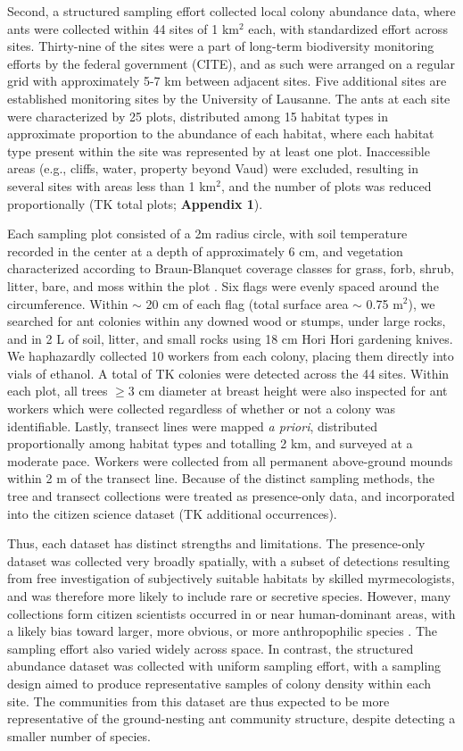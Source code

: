 \documentclass[preprint,review,times,12pt]{elsarticle}
\begin{document}
Second, a structured sampling effort collected local colony abundance data, where ants were collected within 44 sites of 1 km$^2$ each, with standardized effort across sites. Thirty-nine of the sites were a part of long-term biodiversity monitoring efforts by the federal government (CITE), and as such were arranged on a regular grid with approximately 5-7 km between adjacent sites. Five additional sites are established monitoring sites by the University of Lausanne. The ants at each site were characterized by 25 plots, distributed among 15 habitat types \citep{Gago-Silva2017} in approximate proportion to the abundance of each habitat, where each habitat type present within the site was represented by at least one plot. Inaccessible areas (e.g., cliffs, water, property beyond Vaud) were excluded, resulting in several sites with areas less than 1 km$^2$, and the number of plots was reduced proportionally (TK total plots; \textbf{Appendix 1}). 

Each sampling plot consisted of a 2m radius circle, with soil temperature recorded in the center at a depth of approximately 6 cm, and vegetation characterized according to Braun-Blanquet coverage classes for grass, forb, shrub, litter, bare, and moss within the plot \citep{Douglas1978}. Six flags were evenly spaced around the circumference. Within $\sim$ 20 cm of each flag (total surface area $\sim$ 0.75 m$^2$), we searched for ant colonies within any downed wood or stumps, under large rocks, and in 2 L of soil, litter, and small rocks using 18 cm Hori Hori gardening knives. We haphazardly collected 10 workers from each colony, placing them directly into vials of ethanol. A total of TK colonies were detected across the 44 sites. Within each plot, all trees $\geq$3 cm diameter at breast height were also inspected for ant workers which were collected regardless of whether or not a colony was identifiable. Lastly, transect lines were mapped \emph{a priori}, distributed proportionally among habitat types and totalling 2 km, and surveyed at a moderate pace. Workers were collected from all permanent above-ground mounds within 2 m of the transect line. Because of the distinct sampling methods, the tree and transect collections were treated as presence-only data, and incorporated into the citizen science dataset (TK additional occurrences). 

Thus, each dataset has distinct strengths and limitations. The presence-only dataset was collected very broadly spatially, with a subset of detections resulting from free investigation of subjectively suitable habitats by skilled myrmecologists, and was therefore more likely to include rare or secretive species. However, many collections form citizen scientists occurred in or near human-dominant areas, with a likely bias toward larger, more obvious, or more anthropophilic species \citep{Ward2014, Troudet2017}. The sampling effort also varied widely across space. In contrast, the structured abundance dataset was collected with uniform sampling effort, with a sampling design aimed to produce representative samples of colony density within each site. The communities from this dataset are thus expected to be more representative of the ground-nesting ant community structure, despite detecting a smaller number of species. 
\end{document}
